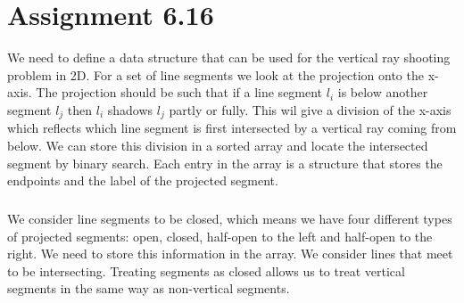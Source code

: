 \documentclass[10pt,a4paper,final,oneside,openany,article,oldfontcommands]{memoir}
\begin{document}
\chapter*{Assignment 6.16}
We need to define a data structure that can be used for the vertical ray shooting problem in 2D. For a set of line segments we look at the projection onto the x-axis. The projection should be such that if a line segment $l_i$ is below another segment $l_j$ then $l_i$ shadows $l_j$ partly or fully. This wil give a division of the x-axis which reflects which line segment is first intersected by a vertical ray coming from below. We can store this division in a sorted array and locate the intersected segment by binary search. Each entry in the array is a structure that stores the endpoints and the label of the projected segment.

\paragraph{}
We consider line segments to be closed, which means we have four different types of projected segments: open, closed, half-open to the left and half-open to the right. We need to store this information in the array. We consider lines that meet to be intersecting. Treating segments as closed allows us to treat vertical segments in the same way as non-vertical segments.
\end{document}
